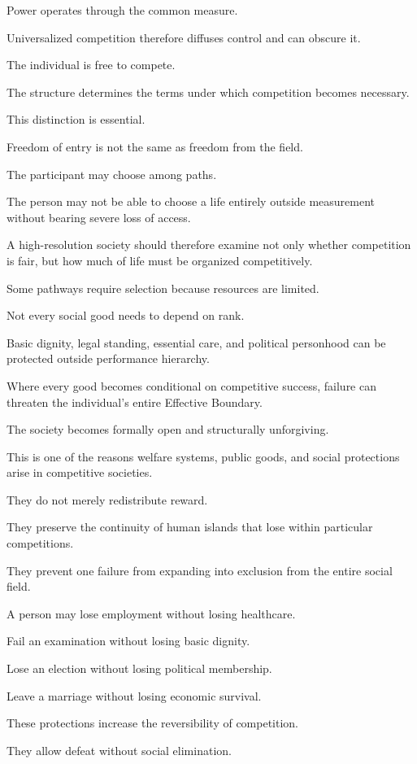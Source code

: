 Power operates through the common measure.

Universalized competition therefore diffuses control and can obscure it.

The individual is free to compete.

The structure determines the terms under which competition becomes necessary.

This distinction is essential.

Freedom of entry is not the same as freedom from the field.

The participant may choose among paths.

The person may not be able to choose a life entirely outside measurement without bearing severe loss of access.

A high-resolution society should therefore examine not only whether competition is fair, but how much of life must be organized competitively.

Some pathways require selection because resources are limited.

Not every social good needs to depend on rank.

Basic dignity, legal standing, essential care, and political personhood can be protected outside performance hierarchy.

Where every good becomes conditional on competitive success, failure can threaten the individual’s entire Effective Boundary.

The society becomes formally open and structurally unforgiving.

This is one of the reasons welfare systems, public goods, and social protections arise in competitive societies.

They do not merely redistribute reward.

They preserve the continuity of human islands that lose within particular competitions.

They prevent one failure from expanding into exclusion from the entire social field.

A person may lose employment without losing healthcare.

Fail an examination without losing basic dignity.

Lose an election without losing political membership.

Leave a marriage without losing economic survival.

These protections increase the reversibility of competition.

They allow defeat without social elimination.

